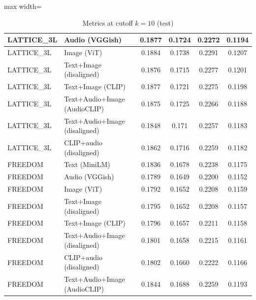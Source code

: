 \begin{table}[H]
\begin{adjustbox}{max width=\textwidth}
\begin{tabular}{|l|l|c|c|c|c|}
    \hline
    LATTICE\_3L & Audio (VGGish) & 0.1877 & 0.1724 & 0.2272 & 0.1194 \\
    \hline
    LATTICE\_3L & Image (ViT) & 0.1884 & 0.1738 & 0.2291 & 0.1207 \\
    \hline
    LATTICE\_3L & Text+Image (disaligned) & 0.1876 & 0.1715 & 0.2277 & 0.1201 \\
    \hline
    LATTICE\_3L & Text+Image (CLIP) & 0.1877 & 0.1721 & 0.2275 & 0.1198 \\
    \hline
    LATTICE\_3L & Text+Audio+Image (AudioCLIP) & 0.1875 & 0.1725 & 0.2266 & 0.1188 \\
    \hline
    LATTICE\_3L & Text+Audio+Image (disaligned) & 0.1848 & 0.171 & 0.2257 & 0.1183 \\
    \hline
    LATTICE\_3L & CLIP+audio (disaligned) & 0.1862 & 0.1716 & 0.2259 & 0.1182 \\
    \hline
    FREEDOM & Text (MiniLM) & 0.1836 & 0.1678 & 0.2238 & 0.1175 \\
    \hline
    FREEDOM & Audio (VGGish) & 0.1789 & 0.1649 & 0.2200 & 0.1152 \\
    \hline
    FREEDOM & Image (ViT) & 0.1792 & 0.1652 & 0.2208 & 0.1159 \\
    \hline
    FREEDOM & Text+Image (disaligned) & 0.1795 & 0.1652 & 0.2208 & 0.1157 \\
    \hline
    FREEDOM & Text+Image (CLIP) & 0.1796 & 0.1657 & 0.2211 & 0.1158 \\
    \hline
    FREEDOM & Text+Audio+Image (disaligned) & 0.1801 & 0.1658 & 0.2215 & 0.1161 \\
    \hline
    FREEDOM & CLIP+audio (disaligned) & 0.1802 & 0.1660 & 0.2222 & 0.1166 \\
    \hline
    FREEDOM & Text+Audio+Image (AudioCLIP) & 0.1844 & 0.1688 & 0.2259 & 0.1193 \\
    \hline
    \end{tabular}
    \end{adjustbox}
    \caption{Metrics at cutoff $k=10$ (test)}
    \label{tab:metrics_k10}
\end{table}

